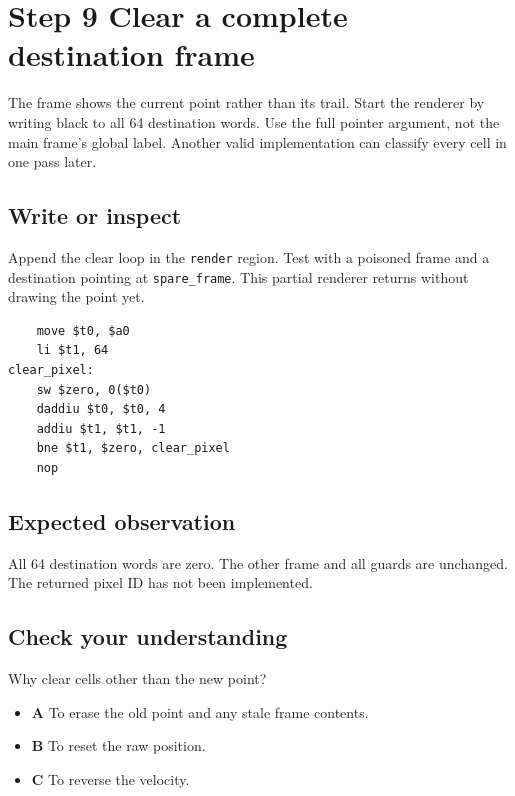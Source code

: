 \section{Step 9 Clear a complete destination frame}\label{ball-s09}

The frame shows the current point rather than its trail. Start the renderer by writing black to all 64 destination words. Use the full pointer argument, not the main frame’s global label. Another valid implementation can classify every cell in one pass later.

\subsection{Write or inspect}
Append the clear loop in the \texttt{render} region. Test with a poisoned frame and a destination pointing at \texttt{spare\_frame}. This partial renderer returns without drawing the point yet.

\begin{verbatim}
    move $t0, $a0
    li $t1, 64
clear_pixel:
    sw $zero, 0($t0)
    daddiu $t0, $t0, 4
    addiu $t1, $t1, -1
    bne $t1, $zero, clear_pixel
    nop
\end{verbatim}

\subsection{Expected observation}
All 64 destination words are zero. The other frame and all guards are unchanged. The returned pixel ID has not been implemented.

\subsection{Check your understanding}
Why clear cells other than the new point?

\begin{itemize}
  \item \textbf{A} To erase the old point and any stale frame contents.
  \item \textbf{B} To reset the raw position.
  \item \textbf{C} To reverse the velocity.
\end{itemize}
